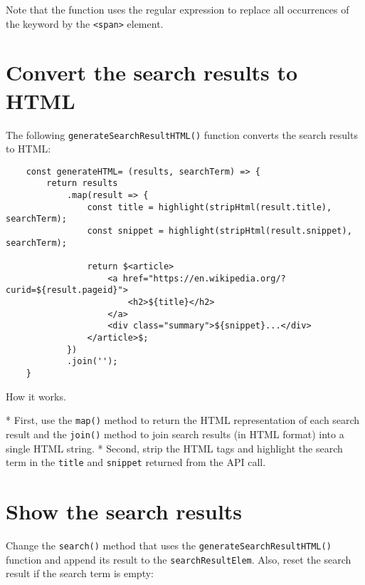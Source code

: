 \documentclass[11pt]{article}
\begin{document}
\noindent
Note that the function uses the regular expression to replace all
occurrences of the keyword by the \verb|<span>| element.

\section*{Convert the search results to HTML}

The following \verb|generateSearchResultHTML()| function converts the search
results to HTML:

\begin{lstlisting}
    const generateHTML= (results, searchTerm) => {
        return results
            .map(result => {
                const title = highlight(stripHtml(result.title), searchTerm);
                const snippet = highlight(stripHtml(result.snippet), searchTerm);

                return $<article>
                    <a href="https://en.wikipedia.org/?curid=${result.pageid}">
                        <h2>${title}</h2>
                    </a>
                    <div class="summary">${snippet}...</div>
                </article>$;
            })
            .join('');
    }
\end{lstlisting}

\noindent
How it works.

* First, use the \verb|map()| method to return the HTML representation of each
search result and the \verb|join()| method to join search results
(in HTML format) into a single HTML string.
* Second, strip the HTML tags and highlight the search term in
the \verb|title| and \verb|snippet| returned from the API call.

\section*{Show the search results}

Change the \verb|search()| method that uses the \verb|generateSearchResultHTML()|
function and append its result to the \verb|searchResultElem|.
Also, reset the search result if the search term is empty:
\end{document}
